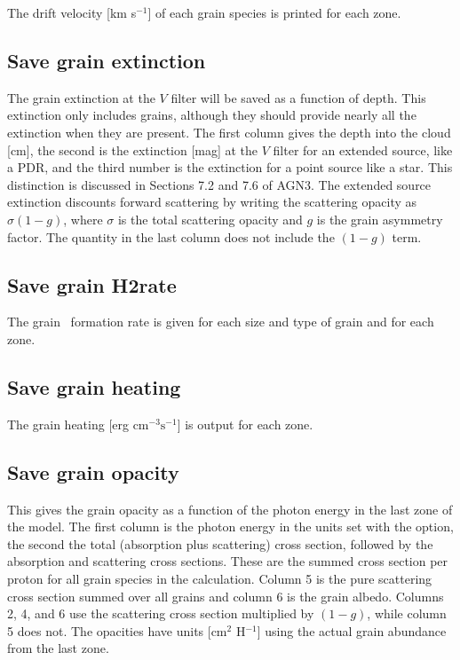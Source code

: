 The drift velocity [km s$^{-1}$] of each grain species is printed for each zone.

\subsection{Save grain extinction}

The grain extinction at the $V$ filter will be saved as a function of
depth.  This extinction only includes grains, although they should provide
nearly all the extinction when they are present.  The first column gives
the depth into the cloud [cm], the second is the extinction [mag] at the
$V$ filter for an extended source, like a PDR, and the third number is the
extinction for a point source like a star.  This distinction is discussed
in Sections 7.2 and 7.6 of AGN3.  The extended source extinction discounts
forward scattering by writing the scattering opacity as $\sigma ( 1-g )$,
where $\sigma$ is the total scattering opacity and $g$ is the grain asymmetry
factor.
The quantity in the last column does not include the $({1-g})$
term.

\subsection{Save grain H2rate}

The grain \htwo\ formation rate is given for each size and type of grain
and for each zone.

\subsection{Save grain heating}

The grain heating [erg cm$^{-3} \mathrm{s}^{-1}$] is output for each zone.

\subsection{Save grain opacity}

This gives the grain opacity as a function of the photon energy in the last
zone of the model.  The first column is the photon energy in the units set
with the  option, the second the total (absorption plus
scattering) cross section, followed by the absorption and scattering cross
sections.  These are the summed cross section per proton for all grain
species in the calculation. Column 5 is the pure scattering cross section
summed over all grains and column 6 is the grain albedo.   Columns 2, 4,
and 6 use the scattering cross section multiplied by $(1-g)$, while column
5 does not. The opacities have units [cm$^{2}$ H$^{-1}$] using the actual
grain abundance from the last zone.


